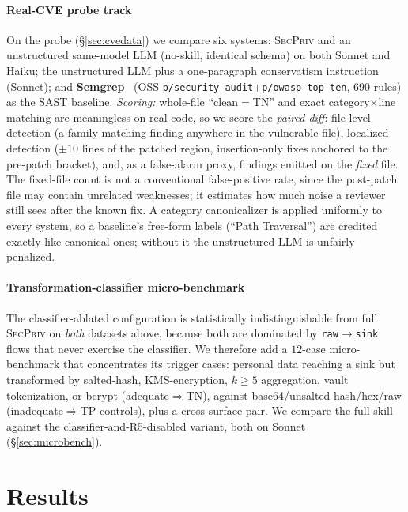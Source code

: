 \documentclass[runningheads]{llncs}
\begin{document}
\paragraph{Real-CVE probe track} On the probe (\S\ref{sec:cvedata}) we compare six systems: \textsc{SecPriv} and an unstructured same-model LLM (no-skill, identical schema) on both Sonnet and Haiku; the unstructured LLM plus a one-paragraph conservatism instruction (Sonnet); and \textbf{Semgrep}~\cite{semgrep2023} (OSS \texttt{p/security-audit}$+$\texttt{p/owasp-top-ten}, $690$ rules) as the SAST baseline. \emph{Scoring:} whole-file ``clean$=$TN'' and exact category$\times$line matching are meaningless on real code, so we score the \emph{paired diff}: file-level detection (a family-matching finding anywhere in the vulnerable file), localized detection ($\pm 10$ lines of the patched region, insertion-only fixes anchored to the pre-patch bracket), and, as a false-alarm proxy, findings emitted on the \emph{fixed} file. The fixed-file count is not a conventional false-positive rate, since the post-patch file may contain unrelated weaknesses; it estimates how much noise a reviewer still sees after the known fix. A category canonicalizer is applied uniformly to every system, so a baseline's free-form labels (``Path Traversal'') are credited exactly like canonical ones; without it the unstructured LLM is unfairly penalized.

\paragraph{Transformation-classifier micro-benchmark} The classifier-ablated configuration is statistically indistinguishable from full \textsc{SecPriv} on \emph{both} datasets above, because both are dominated by \texttt{raw}$\to$\texttt{sink} flows that never exercise the classifier. We therefore add a $12$-case micro-benchmark that concentrates its trigger cases: personal data reaching a sink but transformed by salted-hash, KMS-encryption, $k\!\geq\!5$ aggregation, vault tokenization, or bcrypt (adequate$\Rightarrow$TN), against base64/unsalted-hash/hex/raw (inadequate$\Rightarrow$TP controls), plus a cross-surface pair. We compare the full skill against the classifier-and-R5-disabled variant, both on Sonnet (\S\ref{sec:microbench}).


\section{Results}\label{sec:results}
\end{document}
